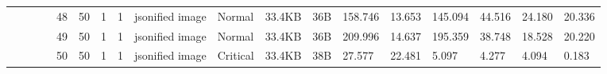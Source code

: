 \begin{landscape}
\begin{table}[]
{\begin{tabular}{@{}ccccllllllllllllll@{}}
                                                                                   &                              &                                &                                                                                                          & 48                                                    & 50                                       & 1                                          & 1                                 & jsonified image                  & Normal                             & 33.4KB                                        & 36B                                             & 158.746                 & 13.653   & 145.094                      & 44.516                  & 24.180   & 20.336                       \\
                                                                                   &                              &                                &                                                                                                          & 49                                                    & 50                                       & 1                                          & 1                                 & jsonified image                  & Normal                             & 33.4KB                                        & 36B                                             & 209.996                 & 14.637   & 195.359                      & 38.748                  & 18.528   & 20.220                       \\
                                                                                   &                              &                                &                                                                                                          & 50                                                    & 50                                       & 1                                          & 1                                 & jsonified image                  & Critical                           & 33.4KB                                        & 38B                                             & 27.577                  & 22.481   & 5.097                        & 4.277                   & 4.094    & 0.183                       
    \end{tabular}%
    }
    \end{table}
    \end{landscape}


